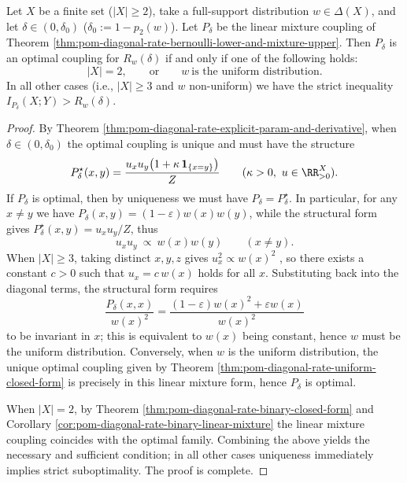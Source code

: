 \begin{theorem}\label{thm:pom-diagonal-rate-mixture-optimality-criterion}
Let \(X\) be a finite set (\(|X|\ge 2\)), take a full-support distribution \(w\in\Delta(X)\), and let \(\delta\in(0,\delta_0)\) (\(\delta_0:=1-p_2(w)\)).
Let \(P_\delta\) be the linear mixture coupling of Theorem \ref{thm:pom-diagonal-rate-bernoulli-lower-and-mixture-upper}.
Then \(P_\delta\) is an optimal coupling for \(R_w(\delta)\) if and only if one of the following holds:
\[
|X|=2,\qquad\text{or}\qquad w\ \text{is the uniform distribution}.
\]
In all other cases (i.e., \(|X|\ge 3\) and \(w\) non-uniform) we have the strict inequality \(I_{P_\delta}(X;Y)>R_w(\delta)\).
\end{theorem}
\begin{proof}
By Theorem \ref{thm:pom-diagonal-rate-explicit-param-and-derivative}, when \(\delta\in(0,\delta_0)\) the optimal coupling is unique and must have the structure
\[
P^\star_\delta(x,y)=\frac{u_xu_y\bigl(1+\kappa\,\mathbf 1_{\{x=y\}}\bigr)}{Z}
\qquad(\kappa>0,\ u\in\RR_{>0}^X).
\]
If \(P_\delta\) is optimal, then by uniqueness we must have \(P_\delta=P^\star_\delta\).
In particular, for any \(x\ne y\) we have \(P_\delta(x,y)=(1-\varepsilon)w(x)w(y)\), while the structural form gives \(P^\star_\delta(x,y)=u_xu_y/Z\), thus
\[
u_xu_y\ \propto\ w(x)w(y)\qquad(x\ne y).
\]
When \(|X|\ge 3\), taking distinct \(x,y,z\) gives
\(
u_x^2\propto w(x)^2
\)
, so there exists a constant \(c>0\) such that \(u_x=c\,w(x)\) holds for all \(x\).
Substituting back into the diagonal terms, the structural form requires
\[
\frac{P_\delta(x,x)}{w(x)^2}=\frac{(1-\varepsilon)w(x)^2+\varepsilon w(x)}{w(x)^2}
\]
to be invariant in \(x\); this is equivalent to \(w(x)\) being constant, hence \(w\) must be the uniform distribution.
Conversely, when \(w\) is the uniform distribution, the unique optimal coupling given by Theorem \ref{thm:pom-diagonal-rate-uniform-closed-form} is precisely in this linear mixture form, hence \(P_\delta\) is optimal.
\par
When \(|X|=2\), by Theorem \ref{thm:pom-diagonal-rate-binary-closed-form} and Corollary \ref{cor:pom-diagonal-rate-binary-linear-mixture} the linear mixture coupling coincides with the optimal family.
Combining the above yields the necessary and sufficient condition; in all other cases uniqueness immediately implies strict suboptimality. The proof is complete.
\end{proof}
\endinput